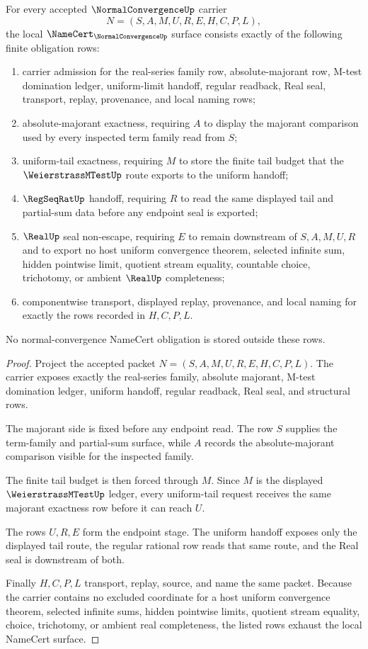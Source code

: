\begin{theorem}
\label{thm:normal-convergence-namecert-obligations}
For every accepted $\NormalConvergenceUp$ carrier
$$
N=(S,A,M,U,R,E,H,C,P,L),
$$
the local $\NameCert_{\NormalConvergenceUp}$ surface consists exactly of the following finite obligation rows:
\begin{enumerate}
\item carrier admission for the real-series family row, absolute-majorant row, M-test domination ledger, uniform-limit handoff, regular readback, Real seal, transport, replay, provenance, and local naming rows;
\item absolute-majorant exactness, requiring $A$ to display the majorant comparison used by every inspected term family read from $S$;
\item uniform-tail exactness, requiring $M$ to store the finite tail budget that the $\WeierstrassMTestUp$ route exports to the uniform handoff;
\item $\RegSeqRatUp$ handoff, requiring $R$ to read the same displayed tail and partial-sum data before any endpoint seal is exported;
\item $\RealUp$ seal non-escape, requiring $E$ to remain downstream of $S,A,M,U,R$ and to export no host uniform convergence theorem, selected infinite sum, hidden pointwise limit, quotient stream equality, countable choice, trichotomy, or ambient $\RealUp$ completeness;
\item componentwise transport, displayed replay, provenance, and local naming for exactly the rows recorded in $H,C,P,L$.
\end{enumerate}
No normal-convergence NameCert obligation is stored outside these rows.
\end{theorem}

\begin{proof}
Project the accepted packet $N=(S,A,M,U,R,E,H,C,P,L)$. The carrier exposes exactly the real-series family, absolute majorant, M-test domination ledger, uniform handoff, regular readback, Real seal, and structural rows.

The majorant side is fixed before any endpoint read. The row $S$ supplies the term-family and partial-sum surface, while $A$ records the absolute-majorant comparison visible for the inspected family.

The finite tail budget is then forced through $M$. Since $M$ is the displayed $\WeierstrassMTestUp$ ledger, every uniform-tail request receives the same majorant exactness row before it can reach $U$.

The rows $U,R,E$ form the endpoint stage. The uniform handoff exposes only the displayed tail route, the regular rational row reads that same route, and the Real seal is downstream of both.

Finally $H,C,P,L$ transport, replay, source, and name the same packet. Because the carrier contains no excluded coordinate for a host uniform convergence theorem, selected infinite sums, hidden pointwise limits, quotient stream equality, choice, trichotomy, or ambient real completeness, the listed rows exhaust the local NameCert surface.
\end{proof}

